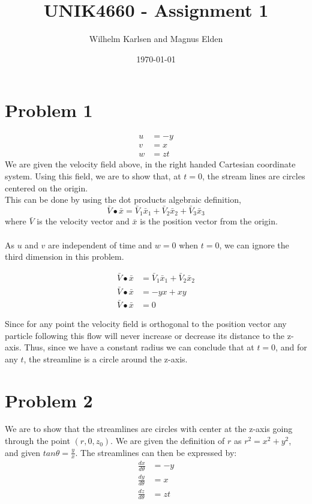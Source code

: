 \documentclass[11pt,a4paper,english]{article}
\title{UNIK4660 - Assignment 1}
\author{Wilhelm Karlsen and Magnus Elden}
\date{\today}
\numberwithin{equation}{section}
\begin{document}
\maketitle

\section{Problem 1}
\begin{align}
	u &= -y \nonumber \\
	v &=  x \nonumber \\
	w &= zt \nonumber
\end{align}
We are given the velocity field above, in the right handed Cartesian coordinate system. Using this field, we are to show that, at $t = 0$, the stream lines are circles centered on the origin. 
\\
This can be done by using the dot products algebraic definition,
$$ \bar{V} \bullet \bar{x} = \bar{V}_{1}\bar{x}_{1} + \bar{V}_{2}\bar{x}_{2} + \bar{V}_{3}\bar{x}_{3}$$
where $\bar{V}$ is the velocity vector and $\bar{x}$ is the position vector from the origin.
\\
\\
As $u$ and $v$ are independent of time and $w = 0$ when $t = 0$, we can ignore the third dimension in this problem.

\begin{align*}
	\bar{V} \bullet \bar{x} &= \bar{V}_{1}\bar{x}_{1} + \bar{V}_{2}\bar{x}_{2}	\\
	\bar{V} \bullet \bar{x} &= -yx + xy	\\
	\bar{V} \bullet \bar{x} &= 0
\end{align*}

Since for any point the velocity field is orthogonal to the position vector any particle following this flow will never increase or decrease its distance to the z-axis. Thus, since we have a constant radius we can conclude that at $t = 0$, and for any $t$, the streamline is a circle around the z-axis.

\section{Problem 2}
We are to show that the streamlines are circles with center at the z-axis going through the point $(r, 0, z_{0})$.
We are given the definition of $r$ as $r^2 = x^2 + y^2$, and given $tan \theta = \frac{y}{x}$.
The streamlines can then be expressed by:
\begin{align}
	\frac{dx}{d\theta} &= -y \nonumber \\
	\frac{dy}{d\theta} &=  x \nonumber \\
	\frac{dz}{d\theta} &= zt \nonumber
\end{align}
\end{document}
